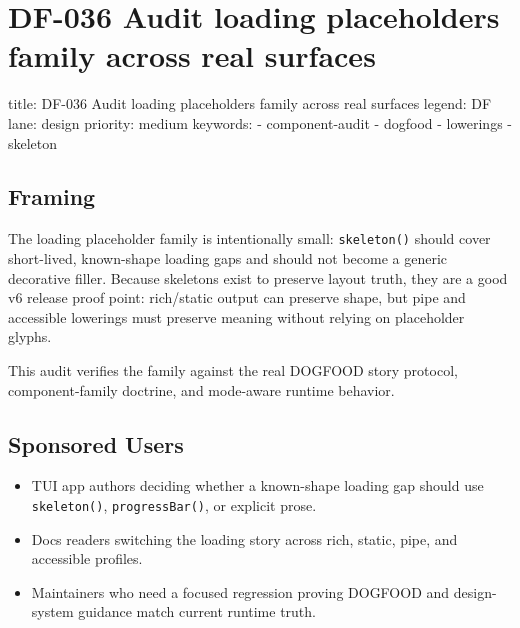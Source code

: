 \chapter{DF-036 Audit loading placeholders family across real surfaces}\label{record-093}

\smallskip

\begin{RecordMeta}
title: DF-036 Audit loading placeholders family across real surfaces
legend: DF
lane: design
priority: medium
keywords:
  - component-audit
  - dogfood
  - lowerings
  - skeleton

\end{RecordMeta}

\section{Framing}\label{record-093-framing}

The loading placeholder family is intentionally small: \texttt{s\allowbreak{}k\allowbreak{}e\allowbreak{}l\allowbreak{}e\allowbreak{}t\allowbreak{}o\allowbreak{}n\allowbreak{}(\allowbreak{})} should cover short-lived, known-shape loading gaps and should not become a generic decorative filler. Because skeletons exist to preserve layout truth, they are a good v6 release proof point: rich/static output can preserve shape, but pipe and accessible lowerings must preserve meaning without relying on placeholder glyphs.

This audit verifies the family against the real DOGFOOD story protocol, component-family doctrine, and mode-aware runtime behavior.

\section{Sponsored Users}\label{record-093-sponsored-users}

\begin{itemize}
\tightlist
\item
  TUI app authors deciding whether a known-shape loading gap should use \texttt{s\allowbreak{}k\allowbreak{}e\allowbreak{}l\allowbreak{}e\allowbreak{}t\allowbreak{}o\allowbreak{}n\allowbreak{}(\allowbreak{})}, \texttt{p\allowbreak{}r\allowbreak{}o\allowbreak{}g\allowbreak{}r\allowbreak{}e\allowbreak{}s\allowbreak{}s\allowbreak{}B\allowbreak{}a\allowbreak{}r\allowbreak{}(\allowbreak{})}, or explicit prose.
\item
  Docs readers switching the loading story across rich, static, pipe, and accessible profiles.
\item
  Maintainers who need a focused regression proving DOGFOOD and design-system guidance match current runtime truth.
\end{itemize}

